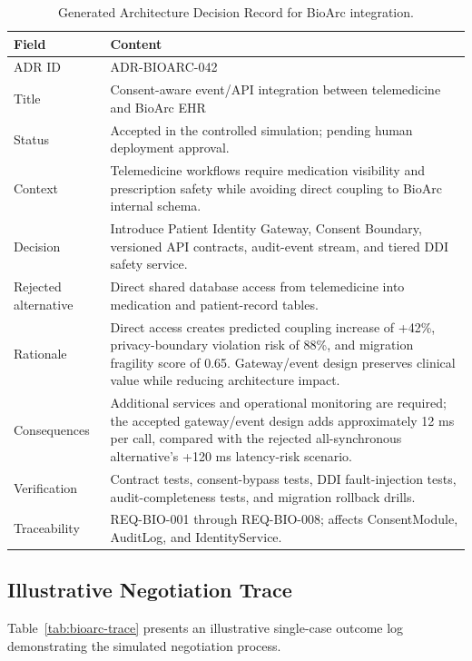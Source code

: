 \documentclass[english,preprint,nonatbib]{elsarticle}
\begin{document}
\begin{longtable}{p{3.2cm}p{13.2cm}}
\caption{Generated Architecture Decision Record for BioArc integration.}\label{tab:bioarc-adr}\\
\toprule
Field & Content \\
\midrule
ADR ID & ADR-BIOARC-042 \\
Title & Consent-aware event/API integration between telemedicine and BioArc EHR \\
Status & Accepted in the controlled simulation; pending human deployment approval. \\
Context & Telemedicine workflows require medication visibility and prescription safety while avoiding direct coupling to BioArc internal schema.
\\
Decision & Introduce Patient Identity Gateway, Consent Boundary, versioned API contracts, audit-event stream, and tiered DDI safety service.
\\
Rejected alternative & Direct shared database access from telemedicine into medication and patient-record tables.
\\
Rationale & Direct access creates predicted coupling increase of +42\%, privacy-boundary violation risk of 88\%, and migration fragility score of 0.65.
Gateway/event design preserves clinical value while reducing architecture impact. \\
Consequences & Additional services and operational monitoring are required; the accepted gateway/event design adds approximately 12 ms per call, compared with the rejected all-synchronous alternative's +120 ms latency-risk scenario. \\
Verification & Contract tests, consent-bypass tests, DDI fault-injection tests, audit-completeness tests, and migration rollback drills.
\\
Traceability & REQ-BIO-001 through REQ-BIO-008; affects ConsentModule, AuditLog, and IdentityService.
\\
\bottomrule
\end{longtable}

\subsection{Illustrative Negotiation Trace}

Table~\ref{tab:bioarc-trace} presents an illustrative single-case outcome log demonstrating the simulated negotiation process.
\end{document}
